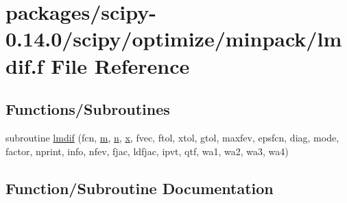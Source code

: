 \hypertarget{lmdif_8f}{}\section{packages/scipy-\/0.14.0/scipy/optimize/minpack/lmdif.f File Reference}
\label{lmdif_8f}
\subsection*{Functions/\+Subroutines}
\begin{DoxyCompactItemize}
\item 
subroutine \hyperlink{lmdif_8f_a14534a3c72e5f075786a8d8e675eb6a2}{lmdif} (fcn, \hyperlink{indexexpr_8h_ab72fdb4031d47b75ab26dd18a437bcdc}{m}, \hyperlink{indexexpr_8h_ab427e2e2b4d6cec55fa088ea2a692ace}{n}, \hyperlink{vecnorm1_8cc_ac73eed9e41ec09d58f112f06c2d6cb63}{x}, fvec, ftol, xtol, gtol, maxfev, epsfcn, diag, mode, factor, nprint, info, nfev, fjac, ldfjac, ipvt, qtf, wa1, wa2, wa3, wa4)
\end{DoxyCompactItemize}


\subsection{Function/\+Subroutine Documentation}
\hypertarget{lmdif_8f_a14534a3c72e5f075786a8d8e675eb6a2}{}
